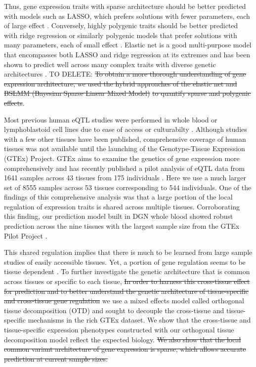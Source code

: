 \documentclass[10pt,letterpaper]{article}
\begin{document}
Thus, gene expression traits with sparse architecture should be better predicted with models such as LASSO, which prefers solutions with fewer parameters, each of large effect \cite{Tibshirani_1996}. Conversely, highly polygenic traits should be better predicted with ridge regression or similarly polygenic models that prefer solutions with many parameters, each of small effect \cite{Hoerl_1970,de_los_Campos_2010,Wheeler_2014}. Elastic net \cite{Zou_2005} is a good multi-purpose model that encompasses both LASSO and ridge regression at its extremes and has been shown to predict well across many complex traits with diverse genetic architectures \cite{abraham2013performance}. TO DELETE: \st{To obtain a more thorough understanding of gene expression architecture, we used the hybrid approaches of the elastic net and BSLMM (Bayesian Sparse Linear Mixed Model)} \cite{Zhou_2013} \st{to quantify sparse and polygenic effects}.

Most previous human eQTL studies were performed in whole blood or lymphoblastoid cell lines due to ease of access or culturabilty \cite{Stranger_2007,Cheung_2005,Battle_2013}. Although studies with a few other tissues have been published, comprehensive coverage of human tissues was not available until the launching of the Genotype-Tissue Expression (GTEx) Project. GTEx aims to examine the genetics of gene expression more comprehensively and has recently published a pilot analysis of eQTL data from 1641 samples across 43 tissues from 175 individuals \cite{Ardlie_2015}. Here we use a much larger set of 8555 samples across 53 tissues corresponding to 544 individuals. One of the findings of this comprehensive analysis was that a large portion of the local regulation of expression traits is shared across multiple tissues. Corroborating this finding, our prediction model built in DGN whole blood showed robust prediction \cite{Gamazon_2015} across the nine tissues with the largest sample size from the GTEx Pilot Project \cite{Ardlie_2015}.

This shared regulation implies that there is much to be learned from large sample studies of easily accessible tissues. Yet, a portion of gene regulation seems to be tissue dependent \cite{Ardlie_2015}. To further investigate the genetic architecture that is common across tissues or specific to each tissue, 
 \st{In order to harness this cross-tissue effect for prediction and to better understand the genetic architecture of tissue-specific and cross-tissue gene regulation} we use a mixed effects model called orthogonal tissue decomposition (OTD) and sought to decouple the cross-tissue and tissue-specific mechanisms in the rich GTEx dataset. We show that the cross-tissue and tissue-specific expression phenotypes constructed with our orthogonal tissue decomposition model reflect the expected biology. \st{We also show that the local common variant architecture of gene expression is sparse, which allows accurate prediction at current sample sizes.}
\end{document}
